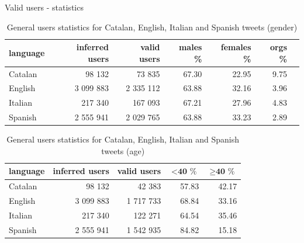 \documentclass[8pt]{beamer}  %
\begin{document}
\begin{frame}{Valid users - statistics}

    \begin{table}[h]
    	\centering
    	\begin{tabular}{lrrrrrr}
    		\toprule
    		\textbf{language} & \textbf{inferred users} & \textbf{valid users} & \textbf{males \%} & \textbf{females \%} & \textbf{orgs \%}
    		\\
    		\midrule
    		Catalan & 98 132 & 73 835 & 67.30 & 22.95 & 9.75
    		\\
    		English & 3 099 883 & 2 335 112 & 63.88 & 32.16 & 3.96 
    		\\
    		Italian & 217 340 & 167 093 & 67.21 & 27.96 & 4.83 
    		\\
    		Spanish & 2 555 941 & 2 029 765 & 63.88 & 33.23 & 2.89 
    		\\
    		\bottomrule
    	\end{tabular}
    	\caption{General users statistics for Catalan, English, Italian and Spanish tweets (gender)}
    	\label{tab:users-languages}
    \end{table}
    
    \begin{table}[h]
    	\centering
    	\begin{tabular}{lrrrr}
    		\toprule
    		\textbf{language} & \textbf{inferred users} & \textbf{valid users} & \(< \textbf{40 \%}\) & \(\geq \textbf{40 \%}\) 
    		\\
    		\midrule
    		Catalan & 98 132 & 42 383 & 57.83 & 42.17
    		\\
    		English & 3 099 883 & 1 717 733 & 68.84 & 33.16 
    		\\
    		Italian & 217 340 & 122 271 & 64.54 & 35.46 
    		\\
    		Spanish & 2 555 941 & 1 542 935 & 84.82 & 15.18
    		\\
    		\bottomrule
    	\end{tabular}
    	\caption{General users statistics for Catalan, English, Italian and Spanish tweets (age)}
    	\label{tab:users-age}
    \end{table}
    
\end{frame}
\end{document}
